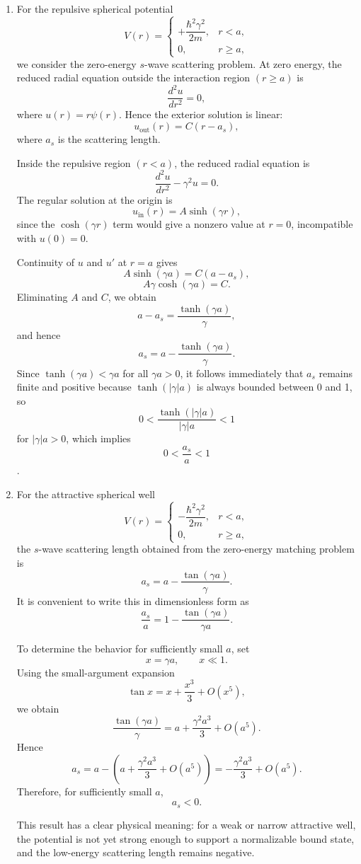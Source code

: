\documentclass[12pt]{article}
\begin{document}
\begin{enumerate}[label=(\alph*)]
\item For the repulsive spherical potential
\[
V(r)=
\begin{cases}
+\dfrac{\hbar^2\gamma^2}{2m}, & r<a,\\[6pt]
0, & r\ge a,
\end{cases}
\]
we consider the zero-energy \(s\)-wave scattering problem. At zero energy, the reduced radial equation outside the interaction region \((r\ge a)\) is
\[
\frac{d^2u}{dr^2}=0,
\]
where \(u(r)=r\psi(r)\). Hence the exterior solution is linear:
\[
u_{\text{out}}(r)=C(r-a_s),
\]
where \(a_s\) is the scattering length.

Inside the repulsive region \((r<a)\), the reduced radial equation is
\[
\frac{d^2u}{dr^2}-\gamma^2u=0.
\]
The regular solution at the origin is
\[
u_{\text{in}}(r)=A\sinh(\gamma r),
\]
since the \(\cosh(\gamma r)\) term would give a nonzero value at \(r=0\), incompatible with \(u(0)=0\).

Continuity of \(u\) and \(u'\) at \(r=a\) gives
\[
A\sinh(\gamma a)=C(a-a_s),
\]
\[
A\gamma\cosh(\gamma a)=C.
\]
Eliminating \(A\) and \(C\), we obtain
\[
a-a_s=\frac{\tanh(\gamma a)}{\gamma},
\]
and hence
\[
\boxed{
a_s=a-\frac{\tanh(\gamma a)}{\gamma}
}.
\]
Since \(\tanh(\gamma a)<\gamma a\) for all \(\gamma a>0\), it follows immediately that $a_s$ remains finite and positive because $\tanh(|\gamma|a)$ is always bounded between 0 and 1, so
\[0<\frac{\tanh(|\gamma|a)}{|\gamma|a}<1\]
for $|\gamma|a>0$, which implies
\[0<\frac{a_s}{a}<1\].

\item For the attractive spherical well
\[
V(r)=
\begin{cases}
-\dfrac{\hbar^2\gamma^2}{2m}, & r<a,\\[6pt]
0, & r\ge a,
\end{cases}
\]
the \(s\)-wave scattering length obtained from the zero-energy matching problem is
\[
a_s=a-\frac{\tan(\gamma a)}{\gamma}.
\]
It is convenient to write this in dimensionless form as
\[
\frac{a_s}{a}=1-\frac{\tan(\gamma a)}{\gamma a}.
\]

To determine the behavior for sufficiently small \(a\), set
\[
x=\gamma a,
\qquad x\ll 1.
\]
Using the small-argument expansion
\[
\tan x = x+\frac{x^3}{3}+O(x^5),
\]
we obtain
\[
\frac{\tan(\gamma a)}{\gamma}
=
a+\frac{\gamma^2a^3}{3}+O(a^5).
\]
Hence
\[
a_s
=
a-\left(a+\frac{\gamma^2a^3}{3}+O(a^5)\right)
=
-\frac{\gamma^2a^3}{3}+O(a^5).
\]
Therefore, for sufficiently small \(a\),
\[
\boxed{
a_s<0.
}
\]

This result has a clear physical meaning: for a weak or narrow attractive well, the potential is not yet strong enough to support a normalizable bound state, and the low-energy scattering length remains negative.


\end{enumerate}
\end{document}
